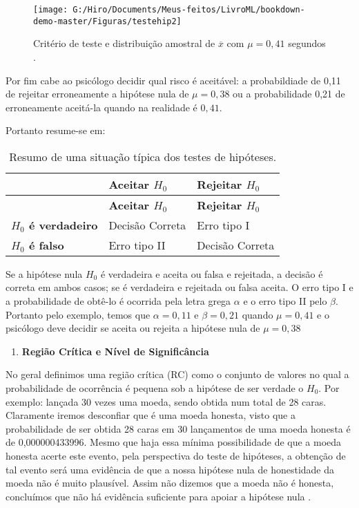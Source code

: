 \documentclass[
  openany]{book}
\providecommand{\tightlist}{%
  \setlength{\itemsep}{0pt}\setlength{\parskip}{0pt}}
\begin{document}
\begin{figure}

{\centering \texttt{[image: G:/Hiro/Documents/Meus-feitos/LivroML/bookdown-demo-master/Figuras/testehip2]} 

}

\caption{Critério de teste e distribuição amostral de \(\overline{x}\) com \(\mu =0,41\) segundos \citep{freund2009estatistica}.}\label{fig:testehip2}
\end{figure}



Por fim cabe ao psicólogo decidir qual risco é aceitável: a probabildiade de 0,11 de rejeitar erroneamente a hipótese nula de \(\mu = 0,38\) ou a probabilidade 0,21 de erroneamente aceitá-la quando na realidade é \(0,41\).

Portanto resume-se em:

\begin{longtable}[]{@{}lll@{}}
\caption{\label{tab:tabelahipotese} Resumo de uma situação típica dos testes de hipóteses.}\tabularnewline
\toprule
& \textbf{Aceitar \(H_0\)} & \textbf{Rejeitar \(H_0\)}\tabularnewline
\midrule
\endfirsthead
\toprule
& \textbf{Aceitar \(H_0\)} & \textbf{Rejeitar \(H_0\)}\tabularnewline
\midrule
\endhead
\textbf{\(H_0\) é verdadeiro} & Decisão Correta & Erro tipo I\tabularnewline
\textbf{\(H_0\) é falso} & Erro tipo II & Decisão Correta\tabularnewline
\bottomrule
\end{longtable}

Se a hipótese nula \(H_0\) é verdadeira e aceita ou falsa e rejeitada, a decisão é correta em ambos casos; se é verdadeira e rejeitada ou falsa aceita. O erro tipo I e a probabilidade de obtê-lo é ocorrida pela letra grega \(\alpha\) e o erro tipo II pelo \(\beta\). Portanto pelo exemplo, temos que \(\alpha=0,11\) e \(\beta=0,21\) quando \(\mu=0,41\) e o psicólogo deve decidir se aceita ou rejeita a hipótese nula de \(\mu=0,38\)

\begin{enumerate}
\def\labelenumi{\arabic{enumi}.}
\setcounter{enumi}{12}
\tightlist
\item
  \textbf{Região Crítica e Nível de Significância}
\end{enumerate}

No geral definimos uma região crítica (RC) como o conjunto de valores no qual a probabilidade de ocorrência é pequena sob a hipótese de ser verdade o \(H_0\). Por exemplo: lançada 30 vezes uma moeda, sendo obtida num total de 28 caras. Claramente iremos desconfiar que é uma moeda honesta, visto que a probabilidade de ser obtida 28 caras em 30 lançamentos de uma moeda honesta é de 0,000000433996. Mesmo que haja essa mínima possibilidade de que a moeda honesta acerte este evento, pela perspectiva do teste de hipóteses, a obtenção de tal evento será uma evidência de que a nossa hipótese nula de honestidade da moeda não é muito plausível. Assim não dizemos que a moeda não é honesta, concluímos que não há evidência suficiente para apoiar a hipótese nula \citep{fariaestatistic}.
\end{document}
